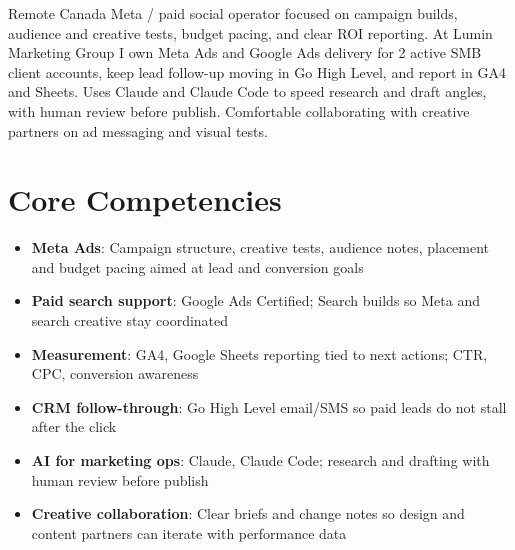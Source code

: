 \documentclass[11pt,a4paper,sans]{moderncv}
\begin{document}
\makecvtitle

\vspace{6pt}
\small{Remote Canada Meta / paid social operator focused on campaign builds, audience and creative tests, budget pacing, and clear ROI reporting. At Lumin Marketing Group I own Meta Ads and Google Ads delivery for 2 active SMB client accounts, keep lead follow-up moving in Go High Level, and report in GA4 and Sheets. Uses Claude and Claude Code to speed research and draft angles, with human review before publish. Comfortable collaborating with creative partners on ad messaging and visual tests.}

\section{Core Competencies}
\vspace{1pt}
\begin{itemize}
\item \textbf{Meta Ads}: Campaign structure, creative tests, audience notes, placement and budget pacing aimed at lead and conversion goals
\item \textbf{Paid search support}: Google Ads Certified; Search builds so Meta and search creative stay coordinated
\item \textbf{Measurement}: GA4, Google Sheets reporting tied to next actions; CTR, CPC, conversion awareness
\item \textbf{CRM follow-through}: Go High Level email/SMS so paid leads do not stall after the click
\item \textbf{AI for marketing ops}: Claude, Claude Code; research and drafting with human review before publish
\item \textbf{Creative collaboration}: Clear briefs and change notes so design and content partners can iterate with performance data
\end{itemize}
\end{document}
